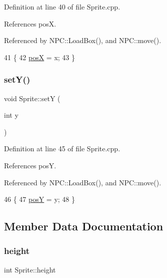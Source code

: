 Definition at line 40 of file Sprite.\+cpp.



References posX.



Referenced by N\+P\+C\+::\+Load\+Box(), and N\+P\+C\+::move().


\begin{DoxyCode}
41 \{
42     \hyperlink{class_sprite_a0af496e3e6540f1f1321913a741a737a}{posX} = x;
43 \}
\end{DoxyCode}
\mbox{\label{class_sprite_afe7d6d636fc460358c40a403af259d0e}} 
\subsubsection{\texorpdfstring{set\+Y()}{setY()}}
{\footnotesize\ttfamily void Sprite\+::setY (\begin{DoxyParamCaption}\item[{int}]{y }\end{DoxyParamCaption})}



Definition at line 45 of file Sprite.\+cpp.



References posY.



Referenced by N\+P\+C\+::\+Load\+Box(), and N\+P\+C\+::move().


\begin{DoxyCode}
46 \{
47     \hyperlink{class_sprite_a1ef80a5eff9d5b0bb90ae355daf09efe}{posY} = y;
48 \}
\end{DoxyCode}


\subsection{Member Data Documentation}
\mbox{\label{class_sprite_a1f07c8f2080c193759aec0e13503d7ab}} 
\subsubsection{\texorpdfstring{height}{height}}
{\footnotesize\ttfamily int Sprite\+::height\hspace{0.3cm}{\ttfamily [private]}}



